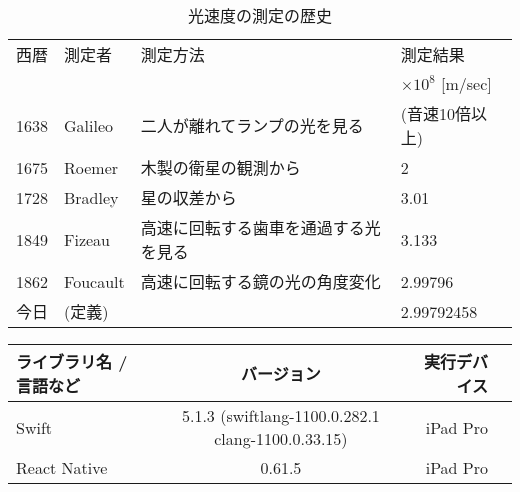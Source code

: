 \begin{table}[h]
  \caption{光速度の測定の歴史}
  \label{table:SpeedOfLight}
  \centering
   \begin{tabular}{clll}
    \hline
    西暦 & 測定者 & 測定方法 & 測定結果 \\
     & & & $\times 10^8$ [m/sec] \\
    \hline \hline
    1638 & Galileo & 二人が離れてランプの光を見る & (音速10倍以上) \\
    1675 & Roemer & 木製の衛星の観測から & 2 \\
    1728 & Bradley & 星の収差から & 3.01 \\
    1849 & Fizeau & 高速に回転する歯車を通過する光を見る & 3.133 \\
    1862 & Foucault & 高速に回転する鏡の光の角度変化 & 2.99796 \\
    今日 & (定義) & & 2.99792458 \\
    \hline
   \end{tabular}
 \end{table}
 
\begin{table}[htb]
    \centering
    \begin{tabular}{|l|c|r||r|} \hline 
      ライブラリ名 / 言語など & バージョン & 実行デバイス \\ \hline \hline
      Swift & 5.1.3 (swiftlang-1100.0.282.1 clang-1100.0.33.15) & iPad Pro \\ \hline
      React Native & 0.61.5 & iPad Pro  \\ \hline
    \end{tabular}
\end{table}

